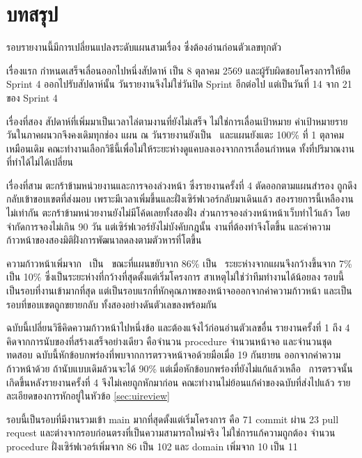 \section{บทสรุป}

รอบรายงานนี้มีการเปลี่ยนแปลงระดับแผนสามเรื่อง ซึ่งต้องอ่านก่อนตัวเลขทุกตัว

เรื่องแรก กำหนดเสร็จเลื่อนออกไปหนึ่งสัปดาห์ เป็น 8 ตุลาคม 2569 และผู้รับผิดชอบโครงการให้ยืด Sprint 4 ออกไปรับสัปดาห์นั้น วันรายงานจึงไม่ใช่วันปิด Sprint อีกต่อไป แต่เป็นวันที่ 14 จาก 21 ของ Sprint 4

เรื่องที่สอง สัปดาห์ที่เพิ่มมาเป็นเวลาไล่ตามงานที่ยังไม่เสร็จ ไม่ใช่การเลื่อนเป้าหมาย ค่าเป้าหมายรายวันในภาคผนวกจึงคงเดิมทุกช่อง แผน ณ วันรายงานยังเป็น \planpct\ และแผนยังแตะ 100\% ที่ 1 ตุลาคมเหมือนเดิม คณะทำงานเลือกวิธีนี้เพื่อไม่ให้ระยะห่างดูแคบลงเองจากการเลื่อนกำหนด ทั้งที่ปริมาณงานที่ทำได้ไม่ได้เปลี่ยน

เรื่องที่สาม ตะกร้าข้ามหน่วยงานและการจองล่วงหน้า ซึ่งรายงานครั้งที่ 4 ตัดออกตามแผนสำรอง ถูกดึงกลับเข้าขอบเขตที่ส่งมอบ เพราะมีเวลาเพิ่มขึ้นและฝั่งเซิร์ฟเวอร์กลับมาเดินแล้ว สองรายการนี้เหลืองานไม่เท่ากัน ตะกร้าข้ามหน่วยงานยังไม่มีโค้ดเลยทั้งสองฝั่ง ส่วนการจองล่วงหน้าหน้าเว็บทำไว้แล้ว โดยจำกัดการจองไม่เกิน 90 วัน แต่เซิร์ฟเวอร์ยังไม่บังคับกฎนั้น งานที่ต้องทำจึงโตขึ้น และค่าความก้าวหน้าของสองมิติฝั่งการพัฒนาลดลงตามตัวหารที่โตขึ้น

ความก้าวหน้าเพิ่มจาก \prevactualpct\ เป็น \actualpct\ ขณะที่แผนขยับจาก 86\% เป็น \planpct\ ระยะห่างจากแผนจึงกว้างขึ้นจาก 7\% เป็น 10\% ซึ่งเป็นระยะห่างที่กว้างที่สุดตั้งแต่เริ่มโครงการ สาเหตุไม่ใช่ว่าทีมทำงานได้น้อยลง รอบนี้เป็นรอบที่งานเข้ามากที่สุด แต่เป็นรอบแรกที่หักคุณภาพของหน้าจอออกจากค่าความก้าวหน้า และเป็นรอบที่ขอบเขตถูกขยายกลับ ทั้งสองอย่างดันตัวเลขลงพร้อมกัน

ฉบับนี้เปลี่ยนวิธีคิดความก้าวหน้าไปหนึ่งข้อ และต้องแจ้งไว้ก่อนอ่านตัวเลขอื่น รายงานครั้งที่ 1 ถึง 4 คิดจากการนับของที่สร้างเสร็จอย่างเดียว คือจำนวน procedure จำนวนหน้าจอ และจำนวนชุดทดสอบ ฉบับนี้หักข้อบกพร่องที่พบจากการตรวจหน้าจอด้วยมือเมื่อ 19 กันยายน ออกจากค่าความก้าวหน้าด้วย ถ้านับแบบเดิมล้วนจะได้ 90\% แต่เมื่อหักข้อบกพร่องที่ยังไม่แก้แล้วเหลือ \actualpct\ การตรวจนั้นเกิดขึ้นหลังรายงานครั้งที่ 4 จึงไม่เคยถูกหักมาก่อน คณะทำงานไม่ย้อนแก้ค่าของฉบับที่ส่งไปแล้ว รายละเอียดของการหักอยู่ในหัวข้อ \ref{sec:uireview}

รอบนี้เป็นรอบที่มีงานรวมเข้า main มากที่สุดตั้งแต่เริ่มโครงการ คือ 71 commit ผ่าน 23 pull request และต่างจากรอบก่อนตรงที่เป็นความสามารถใหม่จริง ไม่ใช่การแก้ความถูกต้อง จำนวน procedure ฝั่งเซิร์ฟเวอร์เพิ่มจาก 86 เป็น 102 และ domain เพิ่มจาก 10 เป็น 11

